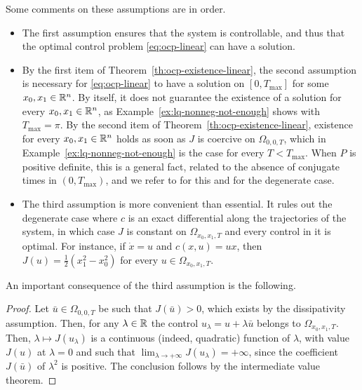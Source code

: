 Some comments on these assumptions are in order.
\begin{itemize}
    \item The first assumption ensures that the system is controllable, and thus that the optimal control problem \eqref{eq:ocp-linear} can have a solution.
    \item By the first item of Theorem~\ref{th:ocp-existence-linear}, the second assumption is necessary for \eqref{eq:ocp-linear} to have a solution on $[0,T_{\max}]$ for some $x_0,x_1\in\mathbb{R}^n$.
    By itself, it does not guarantee the existence of a solution for every $x_0,x_1\in\mathbb{R}^n$, as Example~\ref{ex:lq-nonneg-not-enough} shows with $T_{\max}=\pi$.
    By the second item of Theorem~\ref{th:ocp-existence-linear}, existence for every $x_0,x_1\in\mathbb{R}^n$ holds as soon as $J$ is coercive on $\Omega_{0,0,T}$, which in Example~\ref{ex:lq-nonneg-not-enough} is the case for every $T<T_{\max}$.
    When $P$ is positive definite, this is a general fact, related to the absence of conjugate times in $(0,T_{\max})$, and we refer to \cite{jurdjevicGeometric1997} for this and for the degenerate case.
    \item The third assumption is more convenient than essential.
    It rules out the degenerate case where $c$ is an exact differential along the trajectories of the system, in which case $J$ is constant on $\Omega_{x_0,x_1,T}$ and every control in it is optimal.
    For instance, if $\dot x = u$ and $c(x,u) = ux$, then $J(u) = \frac12(x_1^2-x_0^2)$ for every $u\in\Omega_{x_0,x_1,T}$.
\end{itemize}

An important consequence of the third assumption is the following.


\begin{proof}
    Let $\bar u \in \Omega_{0,0,T}$ be such that $J(\bar u)>0$, which exists by the dissipativity assumption.
    Then, for any $\lambda\in\mathbb{R}$ the control $u_\lambda = u+\lambda\bar u$ belongs to $\Omega_{x_0,x_1,T}$.
    Then, $\lambda\mapsto J(u_\lambda)$ is a continuous (indeed, quadratic) function of $\lambda$, with value $J(u)$ at $\lambda=0$ and such that $\lim_{\lambda\to +\infty} J(u_\lambda) = +\infty$, since the coefficient $J(\bar u)$ of $\lambda^2$ is positive.
    The conclusion follows by the intermediate value theorem.
\end{proof}

